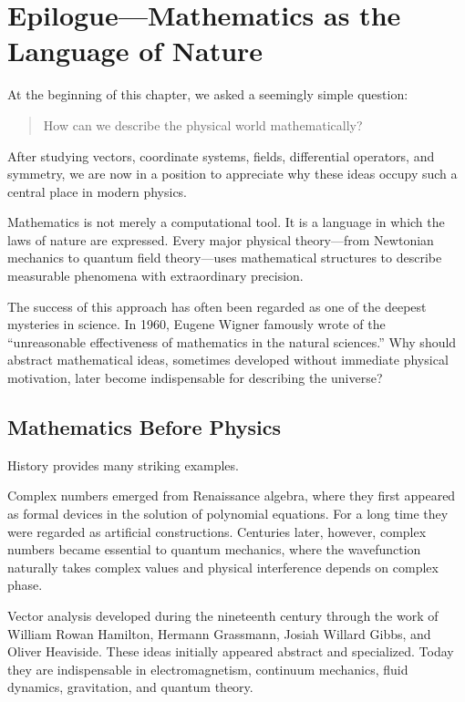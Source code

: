 \section{Epilogue---Mathematics as the Language of Nature}
\label{sec:chapter1-epilogue}

At the beginning of this chapter, we asked a seemingly simple question:

\begin{quote}
How can we describe the physical world mathematically?
\end{quote}

After studying vectors, coordinate systems, fields, differential operators, and
symmetry, we are now in a position to appreciate why these ideas occupy such a
central place in modern physics.

Mathematics is not merely a computational tool. It is a language in which the
laws of nature are expressed. Every major physical theory---from Newtonian
mechanics to quantum field theory---uses mathematical structures to describe
measurable phenomena with extraordinary precision.

The success of this approach has often been regarded as one of the deepest
mysteries in science. In 1960, Eugene Wigner famously wrote of the
``unreasonable effectiveness of mathematics in the natural sciences.'' Why
should abstract mathematical ideas, sometimes developed without immediate
physical motivation, later become indispensable for describing the universe?

\subsection{Mathematics Before Physics}

History provides many striking examples.

Complex numbers emerged from Renaissance algebra, where they first appeared as
formal devices in the solution of polynomial equations. For a long time they
were regarded as artificial constructions. Centuries later, however, complex
numbers became essential to quantum mechanics, where the wavefunction naturally
takes complex values and physical interference depends on complex phase.

Vector analysis developed during the nineteenth century through the work of
William Rowan Hamilton, Hermann Grassmann, Josiah Willard Gibbs, and Oliver
Heaviside. These ideas initially appeared abstract and specialized. Today they
are indispensable in electromagnetism, continuum mechanics, fluid dynamics,
gravitation, and quantum theory.


